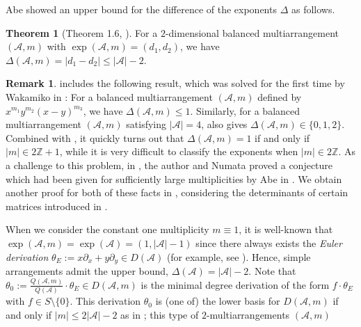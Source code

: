 \documentclass[12pt]{amsart}
\theoremstyle{definition}
\newtheorem{theorem}[definition]{Theorem}
\newtheorem{remark}[definition]{Remark}
\newcommand{\ZZ}{\mathbb{Z}}
\newcommand{\AAA}{\mathcal{A}}
\begin{document}
    Abe showed an upper bound for the difference of the exponents $\Delta$ as follows.
\begin{theorem}[Theorem 1.6, \cite{Abe:chamber}]\label{theorem:upper bound of delta}
    For a $2$-dimensional balanced multiarrangement $(\AAA,m)$ 
    with $\exp(\AAA,m)=(d_1,d_2)$,  
    we have $\Delta(\AAA,m)=|d_1-d_2|\leq|\AAA|-2$. 
\end{theorem}
\begin{remark}\label{remark:upper bound}
     includes the following result, 
    which was solved for the first time by Wakamiko in \cite{Wakamiko}: 
    For a balanced multiarrangement $(\AAA,m)$ defined by $x^{m_1}y^{m_2}(x-y)^{m_3}$, 
    we have $\Delta(\AAA,m)\leq1$. %
    Similarly, for a balanced multiarrangement $(\AAA,m)$ satisfying $|\AAA|=4$, 
     also gives $\Delta(\AAA,m)\in\{0,1,2\}$. 
    Combined with , it quickly turns out that 
    $\Delta(\AAA,m)=1$ if and only if $|m|\in2\ZZ+1$, 
    while it is very difficult to classify the exponents when $|m|\in2\ZZ$. 
    As a challenge to this problem, in \cite{2312.06356}, 
    the author and Numata proved a conjecture 
    which had been given for sufficiently large multiplicities %
    by Abe in \cite{Abe:B_2}. 
    We obtain another proof for both of these facts 
    in , 
    considering the determinants of certain matrices introduced in 
    . 
\end{remark}
%
    When we consider the constant one multiplicity $m\equiv1$, 
    it is well-known that $\exp(\AAA,m)=\exp(\AAA)=(1,|\AAA|-1)$ since 
    there always exists the \emph{Euler derivation} 
    $\theta_{E}:=x\partial_x+y\partial_y\in D(\AAA)$ 
    (for example, see \cite{Orlik-Terao}). 
    Hence, simple arrangements admit the upper bound, 
    $\Delta(\AAA)=|\AAA|-2$. 
    Note that $\theta_0:=\frac{Q(\AAA,m)}{Q(\AAA)}\cdot\theta_E\in D(\AAA,m)$ 
    is the minimal degree derivation of the form $f\cdot\theta_E$ 
    with $f\in S\setminus\{0\}$. 
    This derivation $\theta_0$ is (one of) the lower basis for $D(\AAA,m)$ 
    if and only if $|m|\leq2|\AAA|-2$ as in ; 
    this type of $2$-multiarrangements $(\AAA,m)$ %
\end{document}
